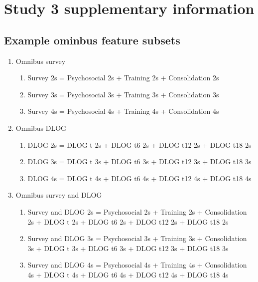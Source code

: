 \documentclass[a4paper,]{book}
\providecommand{\tightlist}{%
  \setlength{\itemsep}{0pt}\setlength{\parskip}{0pt}}
\begin{document}
\hypertarget{study-3-supplementary-information}{%
\section{Study 3 supplementary information}\label{study-3-supplementary-information}}

\hypertarget{example-ominbus-feature-subsets}{%
\subsection{Example ominbus feature subsets}\label{example-ominbus-feature-subsets}}

\begin{enumerate}
\def\labelenumi{\arabic{enumi}.}
\tightlist
\item
  Omnibus survey

  \begin{enumerate}
  \def\labelenumii{\alph{enumii})}
  \tightlist
  \item
    Survey 2s = Psychosocial 2s + Training 2s + Consolidation 2s
  \item
    Survey 3s = Psychosocial 3s + Training 3s + Consolidation 3s
  \item
    Survey 4s = Psychosocial 4s + Training 4s + Consolidation 4s
  \end{enumerate}
\item
  Omnibus DLOG

  \begin{enumerate}
  \def\labelenumii{\alph{enumii})}
  \tightlist
  \item
    DLOG 2s = DLOG t 2s + DLOG t6 2s + DLOG t12 2s + DLOG t18 2s
  \item
    DLOG 3s = DLOG t 3s + DLOG t6 3s + DLOG t12 3s + DLOG t18 3s
  \item
    DLOG 4s = DLOG t 4s + DLOG t6 4s + DLOG t12 4s + DLOG t18 4s
  \end{enumerate}
\item
  Omnibus survey and DLOG

  \begin{enumerate}
  \def\labelenumii{\alph{enumii})}
  \tightlist
  \item
    Survey and DLOG 2s = Psychosocial 2s + Training 2s + Consolidation 2s + DLOG t 2s + DLOG t6 2s + DLOG t12 2s + DLOG t18 2s
  \item
    Survey and DLOG 3s = Psychosocial 3s + Training 3s + Consolidation 3s + DLOG t 3s + DLOG t6 3s + DLOG t12 3s + DLOG t18 3s
  \item
    Survey and DLOG 4s = Psychosocial 4s + Training 4s + Consolidation 4s + DLOG t 4s + DLOG t6 4s + DLOG t12 4s + DLOG t18 4s
  \end{enumerate}
\end{enumerate}
\end{document}
